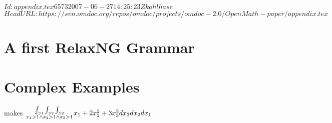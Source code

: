 \svnInfo $Id: appendix.tex 6573 2007-06-27 14:25:23Z kohlhase $
\svnKeyword $HeadURL: https://svn.omdoc.org/repos/omdoc/projects/omdoc-2.0/OpenMath-paper/appendix.tex $
\begin{appendix}
  \section{A first RelaxNG Grammar}
  
  \section{Complex Examples}

  
  
  makes ${\int_{S1}\int_{S2}\int_{S2}\atop x_1>1\wedge x_2>1\wedge x_3>1} x_1+2x_2^2+3x_3^3
  dx_3dx_2 dx_1$
\end{appendix}



